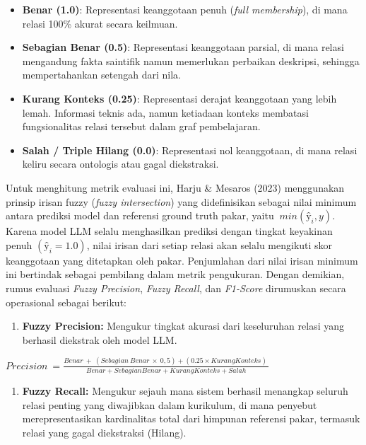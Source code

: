 \documentclass[
]{article}
\begin{document}
\begin{itemize}
\item
  \textbf{Benar (1.0)}: Representasi keanggotaan penuh (\emph{full
  membership}), di mana relasi 100\% akurat secara keilmuan.
\item
  \textbf{Sebagian Benar (0.5)}: Representasi keanggotaan parsial, di
  mana relasi mengandung fakta saintifik namun memerlukan perbaikan
  deskripsi, sehingga mempertahankan setengah dari nila.
\item
  \textbf{Kurang Konteks (0.25)}: Representasi derajat keanggotaan yang
  lebih lemah. Informasi teknis ada, namun ketiadaan konteks membatasi
  fungsionalitas relasi tersebut dalam graf pembelajaran.
\item
  \textbf{Salah / Triple Hilang (0.0)}: Representasi nol keanggotaan, di
  mana relasi keliru secara ontologis atau gagal diekstraksi.
\end{itemize}

Untuk menghitung metrik evaluasi ini, Harju \& Mesaros (2023)
menggunakan prinsip irisan fuzzy (\emph{fuzzy intersection}) yang
didefinisikan sebagai nilai minimum antara prediksi model dan referensi
ground truth pakar, yaitu \(\ min(ŷ_{i},y)\). Karena model LLM selalu
menghasilkan prediksi dengan tingkat keyakinan penuh \((ŷ_{i} = 1.0)\),
nilai irisan dari setiap relasi akan selalu mengikuti skor keanggotaan
yang ditetapkan oleh pakar. Penjumlahan dari nilai irisan minimum ini
bertindak sebagai pembilang dalam metrik pengukuran. Dengan demikian,
rumus evaluasi \emph{Fuzzy Precision}, \emph{Fuzzy Recall}, dan
\emph{F1-Score} dirumuskan secara operasional sebagai berikut:

\begin{enumerate}
\def\labelenumi{\arabic{enumi}.}
\item
  \textbf{Fuzzy Precision:} Mengukur tingkat akurasi dari keseluruhan
  relasi yang berhasil diekstrak oleh model LLM.
\end{enumerate}

\(Precision\  = \frac{Benar\  + \ (Sebagian\ Benar\  \times \ 0,5) + (0.25 \times KurangKonteks)\ }{Benar + SebagianBenar + KurangKonteks + Salah}\)

\begin{enumerate}
\def\labelenumi{\arabic{enumi}.}
\setcounter{enumi}{1}
\item
  \textbf{Fuzzy Recall:} Mengukur sejauh mana sistem berhasil menangkap
  seluruh relasi penting yang diwajibkan dalam kurikulum, di mana
  penyebut merepresentasikan kardinalitas total dari himpunan referensi
  pakar, termasuk relasi yang gagal diekstraksi (Hilang).
\end{enumerate}
\end{document}
